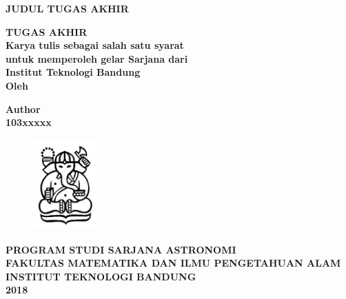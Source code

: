 \begin{titlepage}
\begin{center}

\textbf{\large{JUDUL TUGAS AKHIR
}}\\

\vspace{3cm}

\textbf{\large{TUGAS AKHIR}}\\

\textbf{Karya tulis sebagai salah satu syarat \\
untuk memperoleh gelar Sarjana dari \\
Institut Teknologi Bandung}\\

\vspace{2cm}
\textbf{Oleh}

\textbf{\large{Author\\
103xxxxx}}\\

\vspace{2.0cm}

\begin{figure}[!h]
\centering
\includegraphics[width=2.5cm, height=3.5cm]{pics/gajah.jpg}
\end{figure}

\vspace{2.0cm}

\textbf{\normalsize{PROGRAM STUDI SARJANA ASTRONOMI}\\
\small{FAKULTAS MATEMATIKA DAN ILMU PENGETAHUAN ALAM}\\
\large{INSTITUT TEKNOLOGI BANDUNG \\
2018}}

\end{center}
\end{titlepage}